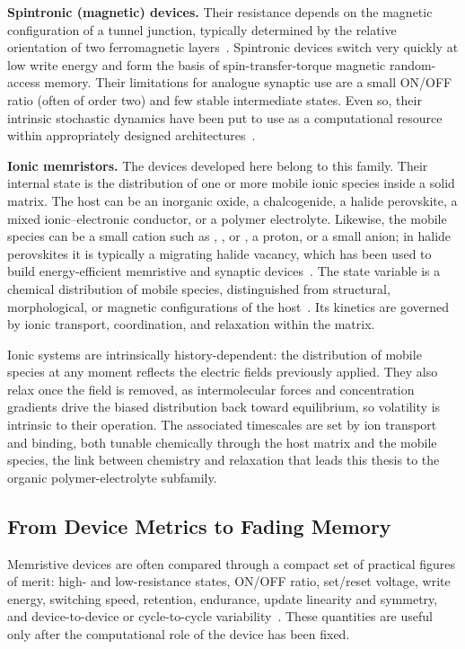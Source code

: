 \documentclass[12pt, twoside]{report}
\begin{document}
\textbf{Spintronic (magnetic) devices.} Their resistance depends on the magnetic configuration of a tunnel junction, typically determined by the relative orientation of two ferromagnetic layers~\cite{Chappert2007}. Spintronic devices switch very quickly at low write energy and form the basis of spin-transfer-torque magnetic random-access memory. Their limitations for analogue synaptic use are a small ON/OFF ratio (often of order two) and few stable intermediate states. Even so, their intrinsic stochastic dynamics have been put to use as a computational resource within appropriately designed architectures~\cite{Mizrahi2018, Torrejon2017}.

\textbf{Ionic memristors.} The devices developed here belong to this family. Their internal state is the distribution of one or more mobile ionic species inside a solid matrix. The host can be an inorganic oxide, a chalcogenide, a halide perovskite, a mixed ionic--electronic conductor, or a polymer electrolyte. Likewise, the mobile species can be a small cation such as , , or , a proton, or a small anion; in halide perovskites it is typically a migrating halide vacancy, which has been used to build energy-efficient memristive and synaptic devices~\cite{Xiao2016}. The state variable is a chemical distribution of mobile species, distinguished from structural, morphological, or magnetic configurations of the host~\cite{WaserAono2007}. Its kinetics are governed by ionic transport, coordination, and relaxation within the matrix.

Ionic systems are intrinsically history-dependent: the distribution of mobile species at any moment reflects the electric fields previously applied. They also relax once the field is removed, as intermolecular forces and concentration gradients drive the biased distribution back toward equilibrium, so volatility is intrinsic to their operation. The associated timescales are set by ion transport and binding, both tunable chemically through the host matrix and the mobile species, the link between chemistry and relaxation that leads this thesis to the organic polymer-electrolyte subfamily.

\subsection{From Device Metrics to Fading Memory}\label{subsec:memristive_metrics}

Memristive devices are often compared through a compact set of practical figures of merit: high- and low-resistance states, ON/OFF ratio, set/reset voltage, write energy, switching speed, retention, endurance, update linearity and symmetry, and device-to-device or cycle-to-cycle variability~\cite{YangStrukovStewart2013, IelminiWong2018, Sun2019}. These quantities are useful only after the computational role of the device has been fixed.
\end{document}
